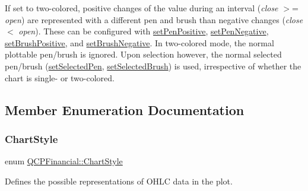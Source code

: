If set to two-\/colored, positive changes of the value during an interval ({\itshape close} $>$= {\itshape open}) are represented with a different pen and brush than negative changes ({\itshape close} $<$ {\itshape open}). These can be configured with \mbox{\hyperlink{class_q_c_p_financial_ac58aa3adc7a35aab0088764b840683e5}{set\+Pen\+Positive}}, \mbox{\hyperlink{class_q_c_p_financial_afe5c07e94ccea01a75b3a2476993c346}{set\+Pen\+Negative}}, \mbox{\hyperlink{class_q_c_p_financial_a5ebff2b1764efd07cc44942e67821829}{set\+Brush\+Positive}}, and \mbox{\hyperlink{class_q_c_p_financial_a8bbdd87629f9144b3ef51af660c0961a}{set\+Brush\+Negative}}. In two-\/colored mode, the normal plottable pen/brush is ignored. Upon selection however, the normal selected pen/brush (\mbox{\hyperlink{class_q_c_p_abstract_plottable_a6911603cad23ab0469b108224517516f}{set\+Selected\+Pen}}, \mbox{\hyperlink{class_q_c_p_abstract_plottable_ae8c816874089f7a44001e8618e81a9dc}{set\+Selected\+Brush}}) is used, irrespective of whether the chart is single-\/ or two-\/colored. 

\subsection{Member Enumeration Documentation}
\mbox{\label{class_q_c_p_financial_a0f800e21ee98d646dfc6f8f89d10ebfb}} 
\subsubsection{\texorpdfstring{Chart\+Style}{ChartStyle}}
{\footnotesize\ttfamily enum \mbox{\hyperlink{class_q_c_p_financial_a0f800e21ee98d646dfc6f8f89d10ebfb}{Q\+C\+P\+Financial\+::\+Chart\+Style}}}

Defines the possible representations of O\+H\+LC data in the plot.

